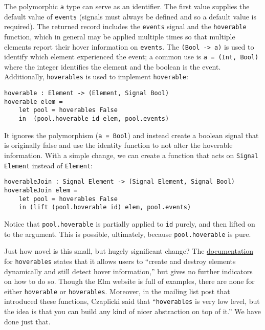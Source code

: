 \documentclass{article}
\begin{document}
The polymorphic \texttt{a} type can serve as an identifier. The first
value supplies the default value of \texttt{events} (signals must always
be defined and so a default value is required). The returned record
includes the \texttt{events} signal and the \texttt{hoverable}
function, which in general may be applied multiple times so that
multiple elements report their hover information on \texttt{events}. The
\texttt{(Bool -> a)} is used to identify which element
experienced the event; a common use is \texttt{a = (Int, Bool)} where
the integer identifies the element and the boolean is the event.
Additionally, \texttt{hoverables} is used to implement
\texttt{hoverable}:

\begin{verbatim}
hoverable : Element -> (Element, Signal Bool)
hoverable elem =
    let pool = hoverables False
    in  (pool.hoverable id elem, pool.events)
\end{verbatim}

It ignores the polymorphism (\texttt{a = Bool}) and instead create a
boolean signal that is originally false and use the identity function to
not alter the hoverable information. With a simple change, we can create
a function that acts on \texttt{Signal Element} instead of
\texttt{Element}:

\begin{verbatim}
hoverableJoin : Signal Element -> (Signal Element, Signal Bool)
hoverableJoin elem =
    let pool = hoverables False
    in (lift (pool.hoverable id) elem, pool.events)
\end{verbatim}

Notice that \texttt{pool.hoverable} is partially applied to \texttt{id}
purely, and then lifted on to the argument. This is possible,
ultimately, because \texttt{pool.hoverable} is pure.

Just how novel is this small, but hugely significant change? The
\href{http://docs.elm-lang.org/library/Graphics/Input.elm\#hoverables}{documentation}
for \texttt{hoverables} states that it allows users to ``create and destroy
elements dynamically and still detect hover information,'' but gives no further
indicators on how to do so. Though the Elm website is full of examples, there
are none for either \texttt{hoverable} or \texttt{hoverables}. Moreover, in the
mailing list post that introduced these functions, Czaplicki said that
``\texttt{hoverables} is very low level, but the idea is that you can build any
kind of nicer abstraction on top of it.'' \cite{hover-forum} We have done just
that.
\end{document}
